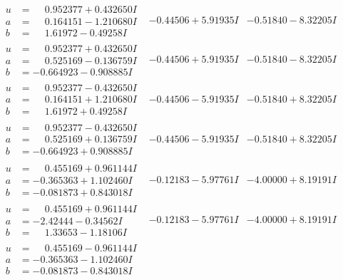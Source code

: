 \documentclass[1p]{elsarticle_modified}
\theoremstyle{definition}
\begin{document}
$$\begin{array}{c|c|c}
\begin{aligned}
u &= \phantom{-}0.952377 + 0.432650 I \\
a &= \phantom{-}0.164151 - 1.210680 I \\
b &= \phantom{-}1.61972 - 0.49258 I\end{aligned}
 & -0.44506 + 5.91935 I & -0.51840 - 8.32205 I \\ \hline\begin{aligned}
u &= \phantom{-}0.952377 + 0.432650 I \\
a &= \phantom{-}0.525169 - 0.136759 I \\
b &= -0.664923 - 0.908885 I\end{aligned}
 & -0.44506 + 5.91935 I & -0.51840 - 8.32205 I \\ \hline\begin{aligned}
u &= \phantom{-}0.952377 - 0.432650 I \\
a &= \phantom{-}0.164151 + 1.210680 I \\
b &= \phantom{-}1.61972 + 0.49258 I\end{aligned}
 & -0.44506 - 5.91935 I & -0.51840 + 8.32205 I \\ \hline\begin{aligned}
u &= \phantom{-}0.952377 - 0.432650 I \\
a &= \phantom{-}0.525169 + 0.136759 I \\
b &= -0.664923 + 0.908885 I\end{aligned}
 & -0.44506 - 5.91935 I & -0.51840 + 8.32205 I \\ \hline\begin{aligned}
u &= \phantom{-}0.455169 + 0.961144 I \\
a &= -0.365363 + 1.102460 I \\
b &= -0.081873 + 0.843018 I\end{aligned}
 & -0.12183 - 5.97761 I & -4.00000 + 8.19191 I \\ \hline\begin{aligned}
u &= \phantom{-}0.455169 + 0.961144 I \\
a &= -2.42444 - 0.34562 I \\
b &= \phantom{-}1.33653 - 1.18106 I\end{aligned}
 & -0.12183 - 5.97761 I & -4.00000 + 8.19191 I \\ \hline\begin{aligned}
u &= \phantom{-}0.455169 - 0.961144 I \\
a &= -0.365363 - 1.102460 I \\
b &= -0.081873 - 0.843018 I\end{aligned}

\end{array}$$
\end{document}

